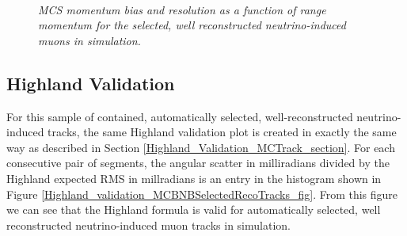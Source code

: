 \begin{figure}
\centering
\mbox{
	\quad
	}
\caption{\textit{MCS momentum bias and resolution as a function of range momentum for the selected, well reconstructed neutrino-induced muons in {\ub} simulation.}}
\label{MCS_range_bias_resolution_MCBNBSelectedRecoTrack_fig}
\end{figure}



\subsection{Highland Validation}\label{Highland_Validation_MCBNBSelectedRecoTrack_section}
For this sample of contained, automatically selected, well-reconstructed neutrino-induced tracks, the same Highland validation plot is created in exactly the same way as described in Section \ref{Highland_Validation_MCTrack_section}. For each consecutive pair of segments, the angular scatter in milliradians divided by the Highland expected RMS in millradians is an entry in the histogram shown in Figure \ref{Highland_validation_MCBNBSelectedRecoTracks_fig}. From this figure we can see that the Highland formula is valid for automatically selected, well reconstructed neutrino-induced muon tracks in simulation.

